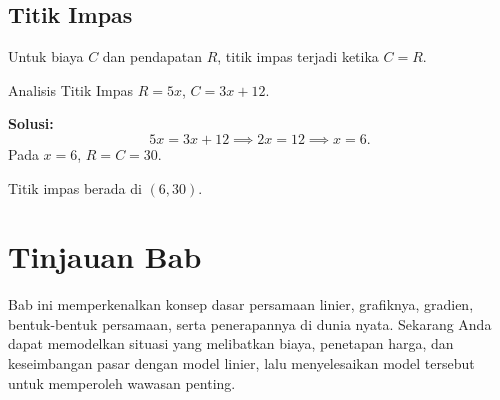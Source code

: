 \subsection*{Titik Impas}
Untuk biaya $C$ dan pendapatan $R$, titik impas terjadi ketika $C=R$.

\begin{example}{Analisis Titik Impas}\label{exa:break-even}
$R=5x$, $C=3x+12$.

\textbf{Solusi:}
\[
5x=3x+12 \implies 2x=12 \implies x=6.
\]
Pada $x=6$, $R=C=30$.

Titik impas berada di $(6,30)$.
\begin{center}
\par{}\label{fig:equations-and-lines-new-tikz10}%

\end{center}
\end{example}

\section*{Tinjauan Bab}
Bab ini memperkenalkan konsep dasar persamaan linier, grafiknya, gradien, bentuk-bentuk persamaan, serta penerapannya di dunia nyata. Sekarang Anda dapat memodelkan situasi yang melibatkan biaya, penetapan harga, dan keseimbangan pasar dengan model linier, lalu menyelesaikan model tersebut untuk memperoleh wawasan penting.

